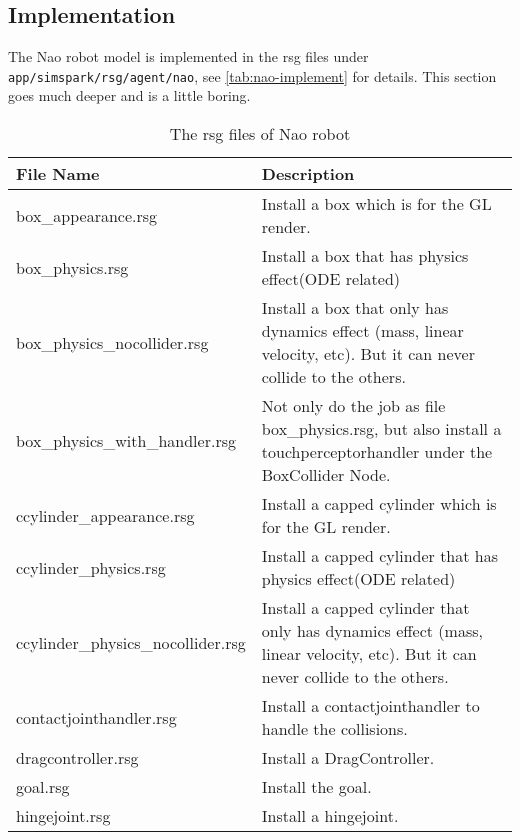 \subsection{Implementation}
The Nao robot model is implemented in the rsg files under
\texttt{app/simspark/rsg/agent/nao}, see \autoref{tab:nao-implement}
for details. This section goes much deeper and is a little boring.
\begin{table}[htp]
  \centering
  \caption{The rsg files of Nao robot}
  \label{tab:nao-implement}
  \begin{tabular}{lp{}}
    \hline
    {\bf File Name}             & {\bf Description} \\
    \hline
    box\_appearance.rsg         & Install a box which is for the GL
    render. \\
    box\_physics.rsg            & Install a box that has physics
    effect(ODE related) \\
    box\_physics\_nocollider.rsg & Install a box that only has dynamics
    effect (mass, linear velocity, etc). But it can never collide to
    the others. \\
    box\_physics\_with\_handler.rsg & Not only do the job as file
    box\_physics.rsg, but also install a touchperceptorhandler under
    the BoxCollider Node. \\
    ccylinder\_appearance.rsg   & Install a capped cylinder which is
    for the GL render. \\
    ccylinder\_physics.rsg      & Install a capped cylinder that has
    physics effect(ODE related) \\
    ccylinder\_physics\_nocollider.rsg & Install a capped cylinder that
    only has dynamics effect (mass, linear velocity, etc). But it can
    never collide to the others. \\
    contactjointhandler.rsg    & Install a contactjointhandler to
    handle the collisions. \\
    dragcontroller.rsg         & Install a DragController. \\
    goal.rsg                   & Install the goal. \\
    hingejoint.rsg             & Install a hingejoint. \\
    \hline
  \end{tabular}
\end{table}

